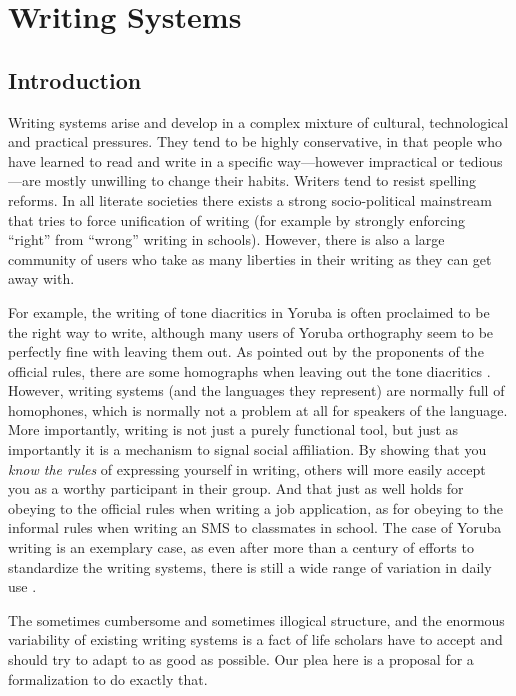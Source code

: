 \chapter{Writing Systems}
\label{writing_systems}

\section{Introduction}
\label{introduction}

Writing systems arise and develop in a complex mixture of cultural,
technological and practical pressures. They tend to be highly conservative, in
that people who have learned to read and write in a specific way---however
impractical or tedious---are mostly unwilling to change their habits. Writers
tend to resist spelling reforms. In all literate societies there exists a strong
socio-political mainstream that tries to force unification of writing (for
example by strongly enforcing ``right'' from ``wrong'' writing in schools).
However, there is also a large community of users who take as many liberties in
their writing as they can get away with.

For example, the writing of tone diacritics in Yoruba is often proclaimed to be
the right way to write, although many users of Yoruba orthography seem to be
perfectly fine with leaving them out. As pointed out by the proponents of the
official rules, there are some homographs when leaving out the tone diacritics
\citep[44]{Olumuyiw2013}. However, writing systems (and the languages they
represent) are normally full of homophones, which is normally not a problem at
all for speakers of the language. More importantly, writing is not just a purely
functional tool, but just as importantly it is a mechanism to signal social
affiliation. By showing that you \textit{know the rules} of expressing yourself
in writing, others will more easily accept you as a worthy participant in their
group. And that just as well holds for obeying to the official rules when
writing a job application, as for obeying to the informal rules when writing an
SMS to classmates in school. The case of Yoruba writing is an exemplary case, as
even after more than a century of efforts to standardize the writing systems,
there is still a wide range of variation in daily use \citep{Olumuyiw2013}.

The sometimes cumbersome and sometimes illogical structure, and the enormous
variability of existing writing systems is a fact of life scholars have to
accept and should try to adapt to as good as possible. Our plea here is a
proposal for a formalization to do exactly that.

